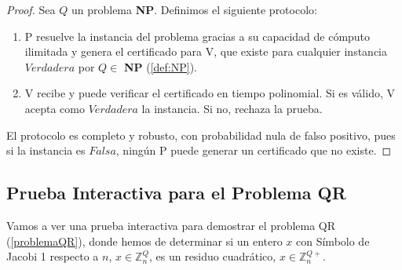 \begin{proof}
	Sea $Q$ un problema \textbf{NP}. Definimos el siguiente protocolo:

	\begin{enumerate}
		\item  P resuelve la instancia del problema gracias a su capacidad de cómputo ilimitada y genera el certificado para V, que existe para cualquier instancia $Verdadera$ por $Q\in$ \textbf{NP} (\ref{def:NP}).
		\item  V recibe y puede verificar el certificado en tiempo polinomial. Si es válido, V acepta como $Verdadera$ la instancia. Si no, rechaza la prueba.
	\end{enumerate}

	El protocolo es completo y robusto, con probabilidad nula de falso positivo, pues si la instancia es $Falsa$, ningún P puede generar un certificado que no existe.

\end{proof}



\subsection{Prueba Interactiva para el Problema QR}

Vamos a ver una prueba interactiva para demostrar el problema QR (\autoref{problemaQR}), donde hemos de determinar si un entero $x$ con Símbolo de Jacobi 1 respecto a $n$, $x \in \mathbb{Z}^Q_n$, es un residuo cuadrático, $x \in \mathbb{Z}^{Q+}_n$.

\hfil

